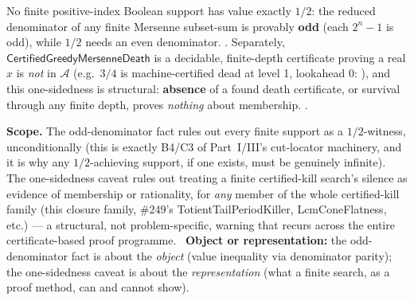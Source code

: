 \begin{prop}
\label{prop:finite-boolSupport-and-onesided}
No finite positive-index Boolean support has value exactly $1/2$: the reduced denominator of any
finite Mersenne subset-sum is provably \textbf{odd} (each $2^n-1$ is odd), while $1/2$ needs an even
denominator.
. Separately,
$\mathsf{CertifiedGreedyMersenneDeath}$ is a decidable, finite-depth certificate proving a real $x$
is \emph{not} in $\mathcal A$ (e.g.\ $3/4$ is machine-certified dead at level 1, lookahead 0:
), and this
one-sidedness is structural: \textbf{absence} of a found death certificate, or survival through any
finite depth, proves \emph{nothing} about membership.
.

\textbf{Scope.} The odd-denominator fact rules out every finite support as a $1/2$-witness,
unconditionally (this is exactly B4/C3 of Part~I/III's cut-locator machinery, and it is why any
$1/2$-achieving support, if one exists, must be genuinely infinite). The one-sidedness caveat rules
out treating a finite certified-kill search's silence as evidence of membership or rationality, for
\emph{any} member of the whole certified-kill family (this closure family, \#249's
\textsf{TotientTailPeriodKiller}, \textsf{LcmConeFlatness}, etc.) — a structural, not
problem-specific, warning that recurs across the entire certificate-based proof programme.
\ \textbf{Object or representation:} the odd-denominator
fact is about the \emph{object} (value inequality via denominator parity); the one-sidedness caveat
is about the \emph{representation} (what a finite search, as a proof method, can and cannot show).
\end{prop}

